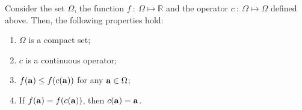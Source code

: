 \documentclass[
]{jss}
\begin{document}
\begin{lemma}
    \label{lemma:Chapter_2_lemma_1}
    Consider the set $\Omega$, the function $f~:~\Omega\mapsto\mathbb{R}$ and the operator $c~:~\Omega\mapsto\Omega$ defined above. Then, the following properties hold:
    \begin{enumerate}[topsep=0pt,itemsep=-0.75ex,partopsep=1ex,parsep=1ex, label = {(\roman*)}]
        \item $\Omega$ is a compact set;
        \item $c$ is a continuous operator;
        \item $f(\mathbf{a})\leq f(c(\mathbf{a}))$ for any $\mathbf{a}\in\Omega$;
        \item If $f(\mathbf{a}) = f(c(\mathbf{a}))$, then $c(\mathbf{a}) = \mathbf{a}$.
    \end{enumerate}
\end{lemma}
\end{document}
